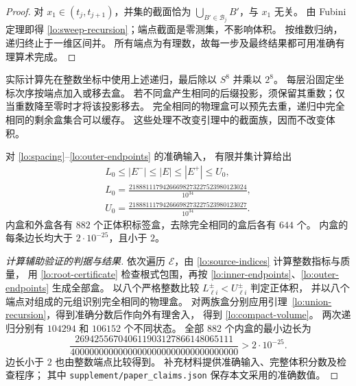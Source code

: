 \begin{proof}
对 $x_1\in(t_j,t_{j+1})$，并集的截面恰为
$\bigcup_{B'\in\mathcal B_j}B'$，与 $x_1$ 无关。
由 Fubini 定理即得 \eqref{lo:sweep-recursion}；端点截面是零测集，不影响体积。
按维数归纳，递归终止于一维区间并。
所有端点为有理数，故每一步及最终结果都可用准确有理算术完成。
\end{proof}

实际计算先在整数坐标中使用上述递归，最后除以 $S^8$ 并乘以 $2^8$。
每层沿固定坐标次序按端点加入或移去盒。
若不同盒产生相同的后缀投影，须保留其重数；仅当重数降至零时才将该投影移去。
完全相同的物理盒可以预先去重，递归中完全相同的剩余盒集合可以缓存。
这些处理不改变引理中的截面族，因而不改变体积。

\begin{lemma}\label{lo:volume-certificate}
对 \eqref{lo:spacing}--\eqref{lo:outer-endpoints} 的准确输入，
有限并集计算给出
\begin{equation}\label{lo:compact-volume}
 \begin{gathered}
 L_0\le |E^-|\le |E|\le |E^+|\le U_0,\\
 L_0=\frac{21888111794266698273227523980123024}{10^{34}},\\
 U_0=\frac{21888111794266698273227523980123027}{10^{34}}.
 \end{gathered}
\end{equation}
内盒和外盒各有 $882$ 个正体积标签盒，去除完全相同的盒后各有 $644$ 个。
内盒的每条边长均大于 $2\cdot10^{-25}$，且小于 $2$。
\end{lemma}

\begin{proof}[计算辅助验证的判据与结果]
依次遍历 $\mathcal E$，由 \eqref{lo:source-indices} 计算整数指标与质量，
用 \eqref{lo:root-certificate} 检查根式包围，再按
\eqref{lo:inner-endpoints}、\eqref{lo:outer-endpoints} 生成全部盒。
以八个严格整数比较 $L_{\ell i}^\pm<U_{\ell i}^\pm$ 判定正体积，
并以八个端点对组成的元组识别完全相同的物理盒。
对两族盒分别应用引理~\ref{lo:union-recursion}，得到准确分数后作向外有理舍入，
得到 \eqref{lo:compact-volume}。
两次递归分别有 $104294$ 和 $106152$ 个不同状态。
全部 $882$ 个内盒的最小边长为
\[
 \frac{269425567040611903127866148065111}
      {40000000000000000000000000000000000}
 >2\cdot10^{-25}.
\]
边长小于 $2$ 也由整数端点比较得到。
补充材料提供准确输入、完整体积分数及检查程序；
其中 \texttt{supplement/paper\_claims.json} 保存本文采用的准确数值。
\end{proof}

